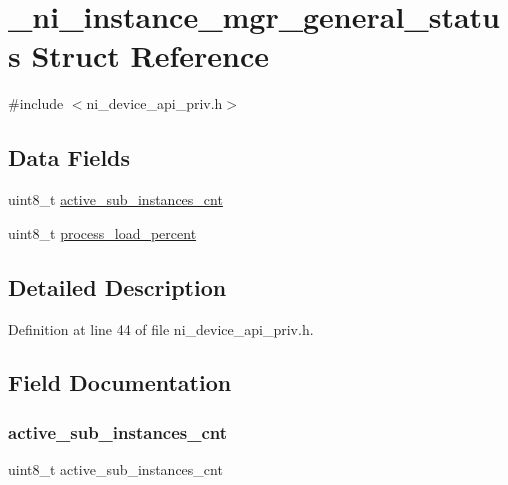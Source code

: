 \hypertarget{struct__ni__instance__mgr__general__status}{}\section{\+\_\+ni\+\_\+instance\+\_\+mgr\+\_\+general\+\_\+status Struct Reference}
\label{struct__ni__instance__mgr__general__status}


{\ttfamily \#include $<$ni\+\_\+device\+\_\+api\+\_\+priv.\+h$>$}

\subsection*{Data Fields}
\begin{DoxyCompactItemize}
\item 
uint8\+\_\+t \mbox{\hyperlink{struct__ni__instance__mgr__general__status_a0bf64d9cad8fedc9cd98c89caafb85b9}{active\+\_\+sub\+\_\+instances\+\_\+cnt}}
\item 
uint8\+\_\+t \mbox{\hyperlink{struct__ni__instance__mgr__general__status_a1da1b7243a38cf621b15dae2123d4763}{process\+\_\+load\+\_\+percent}}
\end{DoxyCompactItemize}


\subsection{Detailed Description}


Definition at line 44 of file ni\+\_\+device\+\_\+api\+\_\+priv.\+h.



\subsection{Field Documentation}
\mbox{\label{struct__ni__instance__mgr__general__status_a0bf64d9cad8fedc9cd98c89caafb85b9}} 
\subsubsection{\texorpdfstring{active\_sub\_instances\_cnt}{active\_sub\_instances\_cnt}}
{\footnotesize\ttfamily uint8\+\_\+t active\+\_\+sub\+\_\+instances\+\_\+cnt}




